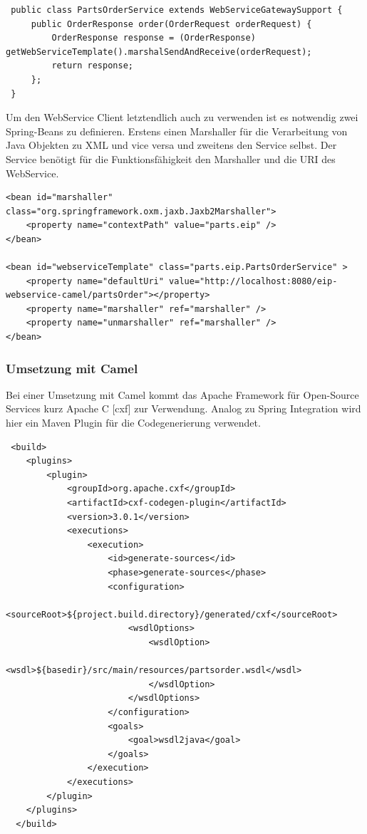 \documentclass[12pt,a4paper,ngerman]{article}
\begin{document}
\begin{lstlisting}
 public class PartsOrderService extends WebServiceGatewaySupport {
     public OrderResponse order(OrderRequest orderRequest) {
         OrderResponse response = (OrderResponse) getWebServiceTemplate().marshalSendAndReceive(orderRequest);
         return response;
     };
 }
\end{lstlisting}

Um den WebService Client letztendlich auch zu verwenden ist es notwendig
zwei Spring-Beans zu definieren. Erstens einen Marshaller für die
Verarbeitung von Java Objekten zu XML und vice versa und zweitens den
Service selbst. Der Service benötigt für die Funktionsfähigkeit den
Marshaller und die URI des WebService.

\begin{lstlisting}
<bean id="marshaller" class="org.springframework.oxm.jaxb.Jaxb2Marshaller">
    <property name="contextPath" value="parts.eip" />
</bean>

<bean id="webserviceTemplate" class="parts.eip.PartsOrderService" >
    <property name="defaultUri" value="http://localhost:8080/eip-webservice-camel/partsOrder"></property>
    <property name="marshaller" ref="marshaller" />
    <property name="unmarshaller" ref="marshaller" />
</bean>
\end{lstlisting}

\subsubsection{Umsetzung mit Camel}

Bei einer Umsetzung mit Camel kommt das Apache Framework für Open-Source Services kurz Apache C [cxf] zur Verwendung. Analog zu Spring Integration wird hier ein Maven Plugin für die Codegenerierung verwendet. 
\begin{lstlisting}
 <build>
    <plugins>
        <plugin>
            <groupId>org.apache.cxf</groupId>
            <artifactId>cxf-codegen-plugin</artifactId>
            <version>3.0.1</version>
            <executions>
                <execution>
                    <id>generate-sources</id>
                    <phase>generate-sources</phase>
                    <configuration>
                        <sourceRoot>${project.build.directory}/generated/cxf</sourceRoot>
                        <wsdlOptions>
                            <wsdlOption>
                                <wsdl>${basedir}/src/main/resources/partsorder.wsdl</wsdl>
                            </wsdlOption>
                        </wsdlOptions>
                    </configuration>
                    <goals>
                        <goal>wsdl2java</goal>
                    </goals>
                </execution>
            </executions>
        </plugin>
    </plugins>
  </build>
\end{lstlisting}
\end{document}
